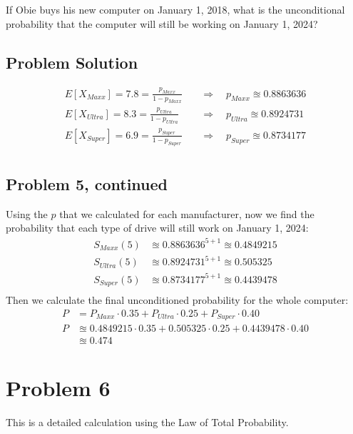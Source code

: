 \documentclass[12pt]{article}
\theoremstyle{definition}
\begin{document}
\bigskip
If Obie buys his new computer on January 1, 2018, what is the unconditional probability that the computer will still be working on January 1, 2024?


\subsection*{Problem Solution}
\begin{align*}
E[X_{Maxx}] = 7.8 = \frac{p_{Maxx}}{1 - p_{Maxx}} \quad&\Rightarrow\quad p_{Maxx} \approxeq 0.8863636\\
E[X_{Ultra}] = 8.3 = \frac{p_{Ultra}}{1 - p_{Ultra}} \quad&\Rightarrow\quad p_{Ultra} \approxeq 0.8924731 \\
E[X_{Super}] = 6.9 = \frac{p_{Super}}{1 - p_{Super}} \quad&\Rightarrow\quad p_{Super} \approxeq 0.8734177\\
\end{align*}

\newpage
\subsection*{Problem 5, continued}


Using the $p$ that we calculated for each manufacturer, now we find the probability that each type of drive will still work on January 1, 2024:
\begin{align*}
S_{Maxx}(5) &\approxeq 0.8863636^{5 + 1} \approxeq 0.4849215\\
S_{Ultra}(5) &\approxeq 0.8924731^{5 + 1} \approxeq 0.505325\\
S_{Super}(5) &\approxeq 0.8734177^{5 + 1} \approxeq 0.4439478\\
\end{align*}
Then we calculate the final unconditioned probability for the whole computer:
\begin{align*}
P &= P_{Maxx}\cdot 0.35 + P_{Ultra}\cdot 0.25 + P_{Super}\cdot 0.40\\
P &\approxeq  0.4849215 \cdot 0.35 +  0.505325 \cdot 0.25 + 0.4439478 \cdot 0.40\\
  &\approxeq 0.474
\end{align*}

\newpage
\section*{Problem 6}

This is a detailed calculation using the Law of Total Probability.
\end{document}
